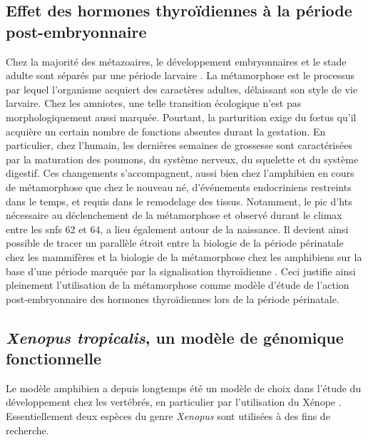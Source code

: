 \documentclass[../main.tex]{subfiles}
\begin{document}

\subsection{Effet des hormones thyroïdiennes à la période post-embryonnaire}
Chez la majorité des métazoaires, le développement embryonnaires et le stade adulte sont séparés par une période larvaire \citep{Laudet2011b,Holstein2014}.
La métamorphose est le processus par lequel l'organisme acquiert des caractères adultes, délaissant son style de vie larvaire.
Chez les amniotes, une telle transition écologique n'est pas morphologiquement aussi marquée.
Pourtant, la parturition exige du fœtus qu'il acquière un certain nombre de fonctions absentes durant la gestation.
En particulier, chez l'humain, les dernières semaines de grossesse sont caractérisées par la maturation des poumons, du système nerveux, du squelette et du système digestif.
Ces changements s'accompagnent, aussi bien chez l'amphibien en cours de métamorphose que chez le nouveau né, d'événements endocriniens restreints dans le temps, et requis dans le remodelage des tissus.
Notamment, le pic d'\glspl{ht} nécessaire au déclenchement de la métamorphose et observé durant le climax entre les \glspl{snf} 62 et 64, a lieu également autour de la naissance.
Il devient ainsi possible de tracer un parallèle étroit entre la biologie de la période périnatale chez les mammifères et la biologie de la métamorphose chez les amphibiens sur la base d'une période marquée par la signalisation thyroïdienne \citep{Laudet2011b}.
Ceci justifie ainsi pleinement l'utilisation de la métamorphose comme modèle d'étude de l'action post-embryonnaire des hormones thyroïdiennes lors de la période périnatale. 


\subsection{\textit{Xenopus tropicalis}, un modèle de génomique fonctionnelle}\label{subsec:xtrop-model}
Le modèle amphibien a depuis longtemps été un modèle de choix dans l'étude du développement chez les vertébrés, en particulier par l'utilisation du Xénope \citep{Harland2011}.
Essentiellement deux espèces du genre \textit{Xenopus} sont utilisées à des fins de recherche.
\end{document}
